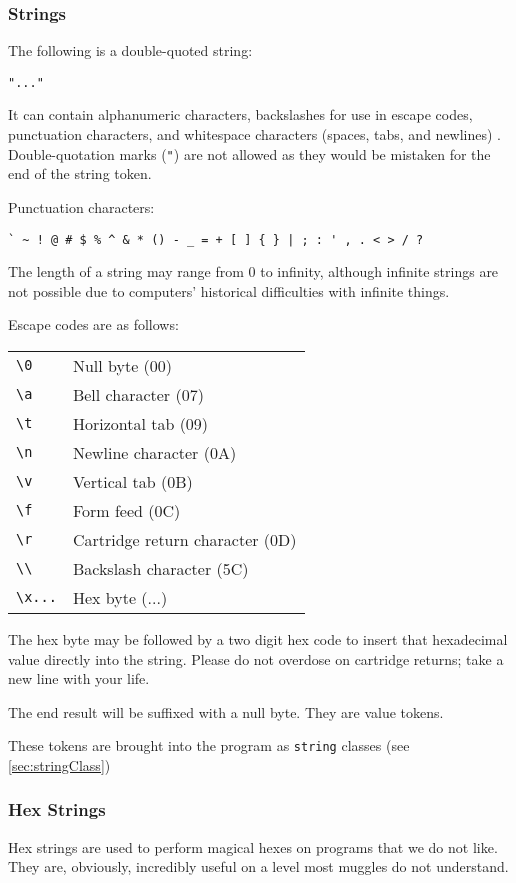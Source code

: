 \documentclass[10pt,a4paper]{article}
\begin{document}
\subsubsection{Strings}
\label{sec:strings}
The following is a double-quoted string:
\begin{verbatim}
"..."
\end{verbatim}
It can contain alphanumeric characters, backslashes for use in escape codes, punctuation characters, and whitespace characters (spaces, tabs, and newlines) . Double-quotation marks (\verb|"|) are not allowed as they would be mistaken for the end of the string token.

Punctuation characters:
\begin{verbatim}
` ~ ! @ # $ % ^ & * () - _ = + [ ] { } | ; : ' , . < > / ?
\end{verbatim}

The length of a string may range from 0 to infinity, although infinite strings are not possible due to computers' historical difficulties with infinite things. 

Escape codes are as follows:

\begin{tabular}{l l}
\verb|\0| & Null byte (00) \\
\verb|\a| & Bell character (07) \\
\verb|\t| & Horizontal tab (09) \\
\verb|\n| & Newline character (0A) \\
\verb|\v| & Vertical tab (0B) \\
\verb|\f| & Form feed (0C) \\
\verb|\r| & Cartridge return character (0D) \\
\verb|\\| & Backslash character (5C) \\
\verb|\x...| & Hex byte (...) \\
\end{tabular}

The hex byte may be followed by a two digit hex code to insert that hexadecimal value directly into the string. Please do not overdose on cartridge returns; take a new line with your life. 

The end result will be suffixed with a null byte. They are value tokens.

These tokens are brought into the program as \verb|string| classes (see \ref{sec:stringClass})

\subsubsection{Hex Strings}
Hex strings are used to perform magical hexes on programs that we do not like. They are, obviously, incredibly useful on a level most muggles do not understand.
\end{document}
